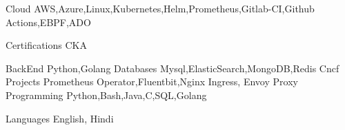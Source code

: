 

\begin{cvskills}

  \cvskill
    {Cloud} %
	{AWS,Azure,Linux,Kubernetes,Helm,Prometheus,Gitlab-CI,Github Actions,EBPF,ADO} %

  \cvskill
    {Certifications} %
	{CKA} %

  \cvskill
   {BackEnd} %
	{Python,Golang} %
  \cvskill
   {Databases} %
	{Mysql,ElasticSearch,MongoDB,Redis} %
\cvskill
{Cncf Projects} %
{Prometheus Operator,Fluentbit,Nginx Ingress, Envoy Proxy} %
  \cvskill
   {Programming} %
	{Python,Bash,Java,C,SQL,Golang} %

  \cvskill
    {Languages} %
	{English, Hindi} %

\end{cvskills}
